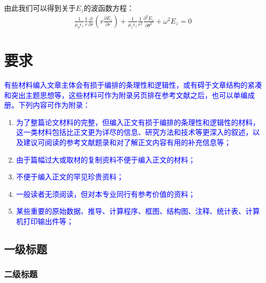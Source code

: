 \begin{appendices}
  由此我们可以得到关于$E_z$的波函数方程：
  \begin{eqnarray}
    \frac{1}{\mu_\theta\epsilon_z}\frac{1}{r}\frac{\partial}{\partial r}
    \left(r\frac{\partial E_z}{\partial r}\right)+
    \frac{1}{\mu_r\epsilon_z}\frac{1}{r^2}\frac{\partial^2E_z}{\partial\theta^2}
    +\omega^2 E_z=0
  \end{eqnarray}

  \chapter{要求}

  \textcolor{blue}{
  有些材料编入文章主体会有损于编排的条理性和逻辑性，或有碍于文章结构的紧凑和突出主题思想等，这些材料可作为附录另页排在参考文献之后，也可以单编成册。下列内容可作为附录：
  }
  \begin{enumerate}
    \item \textcolor{blue}{为了整篇论文材料的完整，但编入正文有损于编排的条理性和逻辑性的材料，这一类材料包括比正文更为详尽的信息、研究方法和技术等更深入的叙述，以及建议可阅读的参考文献题录和对了解正文内容有用的补充信息等；}
    \item \textcolor{blue}{ 由于篇幅过大或取材的复制资料不便于编入正文的材料； }
    \item \textcolor{blue}{ 不便于编入正文的罕见珍贵资料； }
    \item \textcolor{blue}{ 一般读者无须阅读，但对本专业同行有参考价值的资料； }
    \item \textcolor{blue}{ 某些重要的原始数据、推导、计算程序、框图、结构图、注释、统计表、计算机打印输出件等； }
  \end{enumerate}

  \section{一级标题}
  \subsection{二级标题}
\end{appendices}
